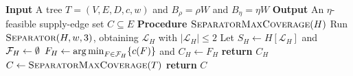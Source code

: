 \begin{algorithm}[h]
    \DontPrintSemicolon
    \caption{Two-separator recursion with core coverage}\label{alg:centroid-max-coverage}
    \textbf{Input} A tree $T=(V,E,D,c,w)$ and $B_\rho=\rho W$ and $B_\eta=\eta W$\;
    \textbf{Output} An $\eta$-feasible supply-edge set $C\subseteq E$\;
    \textbf{Procedure} $\textsc{SeparatorMaxCoverage}(H)$\;
    \Indp
        Run $\textsc{Separator}(H, w, 3)$, obtaining $\mathcal{L}_H$ with $|\mathcal{L}_H|\leq2$\;
        Let $S_H\gets H[\mathcal{L}_H]$ and  $\mathcal{F}_H\gets\emptyset$\;
        $F_H\gets \operatorname*{arg\,min}_{F\in\mathcal{F}_H}\mathopen{}\left\{ c(F) \right\}$ and $C_H\gets F_H$\;
        \textbf{return} $C_H$\;
    \Indm
    $C\gets\textsc{SeparatorMaxCoverage}(T)$\;
    \textbf{return} $C$\;
\end{algorithm}
